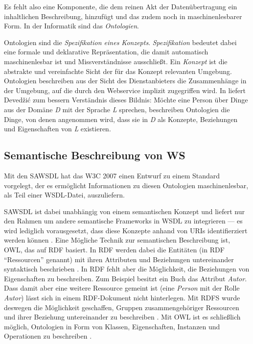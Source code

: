 Es fehlt also eine Komponente, die dem reinen Akt der Datenübertragung ein inhaltlichen Beschreibung, hinzufügt und das zudem noch in maschinenlesbarer Form. In der Informatik sind das \emph{Ontologien}.

Ontologien sind die \emph{Spezifikation eines Konzepts}. \emph{Spezifikation} bedeutet dabei eine formale und deklarative Repräsentation, die damit automatisch maschinenlesbar ist und Missverständnisse ausschließt. Ein \emph{Konzept} ist die abstrakte und vereinfachte Sicht der für das Konzept relevanten Umgebung. Ontologien beschreiben aus der Sicht des Dienstanbieters die Zusammenhänge in der Umgebung, auf die durch den Webservice implizit zugegriffen wird. In \cite[S.31]{dcswe} liefert Devedžić zum bessern Verständnis dieses Bildnis: Möchte eine Person über Dinge aus der Domäne \emph{D} mit der Sprache \emph{L} sprechen, beschreiben Ontologien die Dinge, von denen angenommen wird, dass sie in \emph{D} als Konzepte, Beziehungen und Eigenschaften von \emph{L} existieren.

\subsection{Semantische Beschreibung von \acl{WS}}\label{l:sawsdl}

Mit den \ac{SAWSDL} hat das \ac{W3C} 2007 einen Entwurf zu einem Standard vorgelegt, der es ermöglicht Informationen zu diesen Ontologien maschinenlesbar, als Teil einer \ac{WSDL}-Datei, auszuliefern. 

\ac{SAWSDL} ist dabei unabhängig von einem semantischen Konzept und liefert nur den Rahmen um andere semantische Frameworks in \ac{WSDL} zu integrieren --- es wird lediglich vorausgesetzt, dass diese Konzepte anhand von URIs identifierziert werden können \cite[S.61]{ky-sawsdl}. Eine Mögliche Technik zur semantischen Beschreibung ist, \ac{OWL}, das auf \ac{RDF} basiert. In \ac{RDF} werden dabei die Entitäten (in \ac{RDF} "`Ressourcen"' genannt) mit ihren Attributen und Beziehungen untereinander syntaktisch beschrieben \cite{w3c-rdf}. In \ac{RDF} fehlt aber die Möglichkeit, die Beziehungen von Eigenschaften zu beschreiben. Zum Beispiel besitzt ein Buch das Attribut \emph{Autor}. Dass damit aber eine weitere Ressource gemeint ist (eine \emph{Person} mit der Rolle \emph{Autor}) lässt sich in einem \ac{RDF}-Dokument nicht hinterlegen. Mit \ac{RDFS} wurde deswegen die Möglichkeit geschaffen, Gruppen zusammengehöriger Ressourcen und ihrer Beziehung untereinander zu beschreiben \cite{w3c-rdfs}. Mit \ac{OWL} ist es schließlich möglich, Ontologien in Form von Klassen, Eigenschaften, Instanzen und Operationen zu beschreiben \cite{w3c-owl2primer}.

